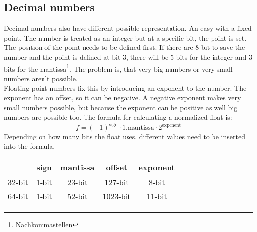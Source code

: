 \documentclass[a4paper]{scrartcl}
\begin{document}
        \subsection*{Decimal numbers}
        Decimal numbers also have different possible representation. An easy with a fixed point. The number is treated as an integer but at a specific bit, the point is 
        set. The position of the point needs to be defined first. If there are 8-bit to save the number and the point is defined at bit 3, there will be 5 bits for the integer
        and 3 bits for the mantissa\footnote{Nachkommastellen}. The problem is, that very big numbers or very small numbers aren't possible. \\
        Floating point numbers fix this by introducing an exponent to the number. The exponent has an offset, so it can be negative. A negative exponent makes very small numbers
        possible, but because the exponent can be positive as well big numbers are possible too. The formula for calculating a normalized float is:
        \begin{equation*}
            f = (-1)^{\text{sign}} \cdot 1.\text{mantissa} \cdot 2^{\text{exponent}}
        \end{equation*}  
        Depending on how many bits the float uses, different values need to be inserted into the formula.
        \begin{center}\begin{tabular}{|c|c|c|c|c|}
            \hline
             & sign & mantissa & offset & exponent \\
            \hline
            32-bit & 1-bit & 23-bit & 127-bit & 8-bit \\
            \hline
            64-bit & 1-bit & 52-bit & 1023-bit & 11-bit \\
            \hline
        \end{tabular}\end{center}
        
\end{document}
